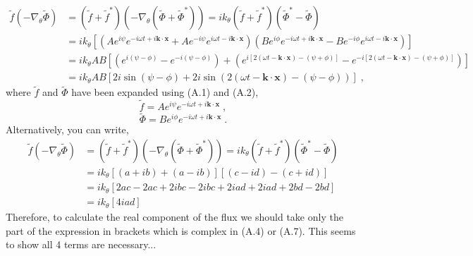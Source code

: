 \documentclass[12pt]{article}
\numberwithin{equation}{subsection}
\begin{document}
   \begin{equation}
   \begin{aligned}
      \widetilde{f}(-\nabla_{\theta}\widetilde{\Phi})
         &= (\widetilde{f}+\widetilde{f}^*)(-\nabla_{\theta}(\widetilde{\Phi} + \widetilde{\Phi}^*))
          = ik_{\theta}(\widetilde{f}+\widetilde{f}^*)(\widetilde{\Phi}^* - \widetilde{\Phi}) \\
         &= ik_{\theta}[(Ae^{i\psi}e^{-i\omega t + i\bm{k}\cdot\bm{x}} + Ae^{-i\psi}e^{i\omega t - i\bm{k}\cdot\bm{x}})
                        (Be^{i\phi}e^{-i\omega t + i\bm{k}\cdot\bm{x}} - Be^{-i\phi}e^{i\omega t - i\bm{k}\cdot\bm{x}})] \\
         &= ik_{\theta}AB[(e^{i(\psi-\phi)} - e^{-i(\psi-\phi)}) + (e^{i[2(\omega t - \bm{k}\cdot\bm{x})-(\psi+\phi)]} - e^{-i[2(\omega t - \bm{k}\cdot\bm{x})-(\psi+\phi)]})] \\
         &= ik_{\theta}AB[2i\sin(\psi-\phi) + 2i\sin(2(\omega t-\bm{k}\cdot\bm{x})-(\psi-\phi))]\;,
   \end{aligned}
   \end{equation}
where $\widetilde{f}$ and $\widetilde{\Phi}$ have been expanded using (A.1) and (A.2),
   \begin{equation}
      \widetilde{f} = Ae^{i\psi}e^{-i\omega t + i\bm{k}\cdot\bm{x}}\;,
   \end{equation}
   \begin{equation}
      \widetilde{\Phi} = Be^{i\phi}e^{-i\omega t + i\bm{k}\cdot\bm{x}}\;.
   \end{equation}
Alternatively, you can write,
   \begin{equation}
   \begin{aligned}
      \widetilde{f}(-\nabla_{\theta}\widetilde{\Phi})
         &= (\widetilde{f}+\widetilde{f}^*)(-\nabla_{\theta}(\widetilde{\Phi} + \widetilde{\Phi}^*))
          = ik_{\theta}(\widetilde{f}+\widetilde{f}^*)(\widetilde{\Phi}^* - \widetilde{\Phi}) \\
         &= ik_{\theta}[(a+ib) + (a-ib)][(c-id) - (c+id)] \\
         &= ik_{\theta}[2ac-2ac + 2ibc - 2ibc + 2iad + 2iad + 2bd - 2bd] \\
         &= ik_{\theta}[4iad]
   \end{aligned}
   \end{equation}
Therefore, to calculate the real component of the flux we should take only the part of the expression in brackets which is complex in (A.4)
or (A.7). This seems to show all 4 terms are necessary...
\end{document}
